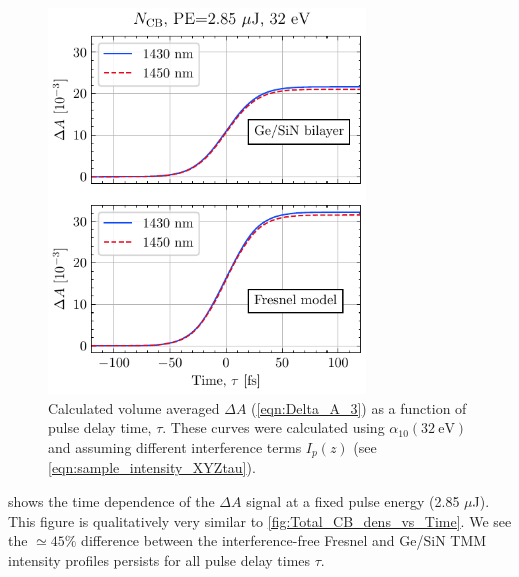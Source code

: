 \begin{figure}
	\centering
	\includegraphics[width=0.75\textwidth]{figures/chap4/FVA_Total_CB_dens_vs_T.pdf}
	\caption{Calculated volume averaged $\Delta A$ (\cref{eqn:Delta_A_3}) as a function of pulse delay time, $\tau$. These curves were calculated using $\alpha_{10}(32 \ \textrm{eV})$ and assuming different interference terms $I_p(z)$ (see \cref{eqn:sample_intensity_XYZtau}).}
	\label{fig:FVA_Total_CB_dens_vs_T}
\end{figure}

 shows the time dependence of the $\Delta A$ signal at a fixed pulse energy (2.85 $\mu$J). This figure is qualitatively very similar to \cref{fig:Total_CB_dens_vs_Time}. We see the $\simeq 45\%$ difference between the interference-free Fresnel and Ge/SiN TMM intensity profiles persists for all pulse delay times $\tau$.

